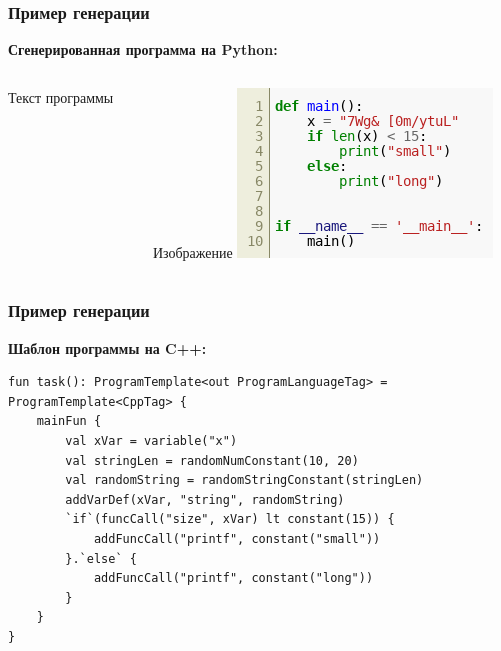 \documentclass[14pt,aspectratio=169,hyperref={pdftex,unicode},xcolor=dvipsnames]{beamer}
\begin{document}
\begin{frame}[fragile]
    \frametitle{Пример генерации}
    \textbf{Сгенерированная программа на Python:}\\
    \begin{columns}
        \begin{column}{0.45\textwidth}
            Текст программы
        \end{column}
        \begin{column}{0.45\textwidth}
            Изображение
            \includegraphics[width=\textwidth]{images/code_image_py.png}
        \end{column}

    \end{columns}
\end{frame}

\begin{frame}[fragile]
    \frametitle{Пример генерации}
    \textbf{Шаблон программы на C++:}\\
    \begin{verbatim}
fun task(): ProgramTemplate<out ProgramLanguageTag> = ProgramTemplate<CppTag> {
    mainFun {
        val xVar = variable("x")
        val stringLen = randomNumConstant(10, 20)
        val randomString = randomStringConstant(stringLen)
        addVarDef(xVar, "string", randomString)
        `if`(funcCall("size", xVar) lt constant(15)) {
            addFuncCall("printf", constant("small"))
        }.`else` {
            addFuncCall("printf", constant("long"))
        }
    }
}
\end{verbatim}
\end{frame}
\end{document}
